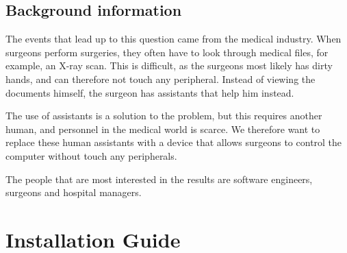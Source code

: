 \documentclass[a4paper]{article}
\begin{document}
  \subsection{Background information}
  The events that lead up to this question came from the medical industry. When
  surgeons perform surgeries, they often have to look through medical files, for
  example, an X-ray scan. This is difficult, as the surgeons most likely has
  dirty hands, and can therefore not touch any peripheral. Instead of viewing
  the documents himself, the surgeon has assistants that help him instead.

  The use of assistants is a solution to the problem, but this requires another
  human, and personnel in the medical world is scarce. We therefore want to
  replace these human assistants with a device that allows surgeons to control
  the computer without touch any peripherals.

  The people that are most interested in the results are software engineers,
  surgeons and hospital managers.

  \section{Installation Guide}





\end{document}
